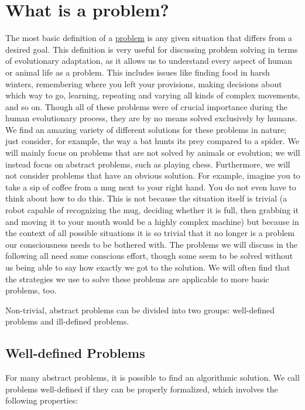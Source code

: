 \documentclass[
]{krantz}
\begin{document}
\section{What is a problem?}\label{what-is-a-problem}

The most basic definition of a \hyperref[problem]{problem} is any given situation that differs from a desired goal. This definition is very useful for discussing problem solving in terms of evolutionary adaptation, as it allows us to understand every aspect of human or animal life as a problem. This includes issues like finding food in harsh winters, remembering where you left your provisions, making decisions about which way to go, learning, repeating and varying all kinds of complex movements, and so on. Though all of these problems were of crucial importance during the human evolutionary process, they are by no means solved exclusively by humans. We find an amazing variety of different solutions for these problems in nature; just consider, for example, the way a bat hunts its prey compared to a spider. We will mainly focus on problems that are not solved by animals or evolution; we will instead focus on abstract problems, such as playing chess. Furthermore, we will not consider problems that have an obvious solution. For example, imagine you to take a sip of coffee from a mug next to your right hand. You do not even have to think about how to do this. This is not because the situation itself is trivial (a robot capable of recognizing the mug, deciding whether it is full, then grabbing it and moving it to your mouth would be a highly complex machine) but because in the context of all possible situations it is so trivial that it no longer is a problem our consciousness needs to be bothered with. The problems we will discuss in the following all need some conscious effort, though some seem to be solved without us being able to say how exactly we got to the solution. We will often find that the strategies we use to solve these problems are applicable to more basic problems, too.

Non-trivial, abstract problems can be divided into two groups: well-defined problems and ill-defined problems.

\subsection*{Well-defined Problems}\label{well-defined-problems}


For many abstract problems, it is possible to find an algorithmic solution. We call problems well-defined if they can be properly formalized, which involves the following properties:
\end{document}

